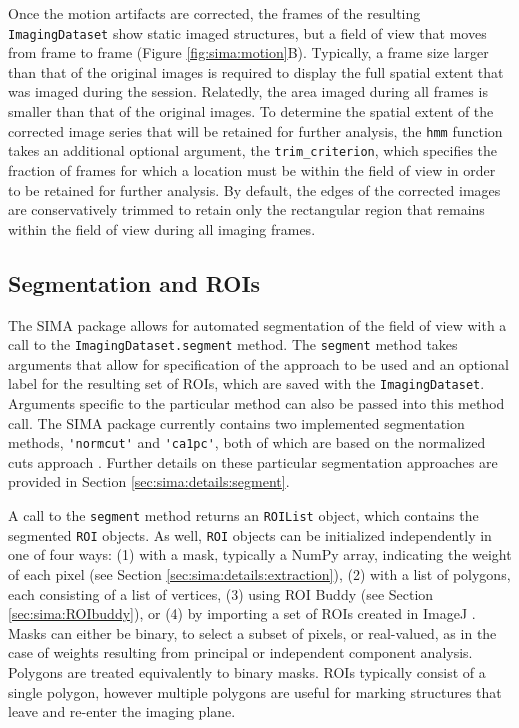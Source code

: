 Once the motion artifacts are corrected, the frames of the resulting \verb|ImagingDataset| show static
imaged structures, but a field of view that moves from frame to frame (Figure \ref{fig:sima:motion}B).
Typically, a frame size larger than that of the original images is required to display
the full spatial extent that was imaged during the session.
Relatedly, the area imaged during all frames is smaller than that of the original
images.
To determine the spatial extent of the corrected image series that will be
retained for further analysis, the \verb|hmm| function takes an additional
optional argument, 
the \verb|trim_criterion|, which specifies the fraction of frames for which
a location must be within the field of view in order to be retained for further
analysis.
By default, the edges of the corrected images are conservatively trimmed to retain
only the rectangular region that remains within the field of view during all imaging frames.


\subsection{Segmentation and ROIs}\label{sec:sima:ROIs}
The SIMA package allows for automated segmentation of the field of view with a call to the \verb|ImagingDataset.segment|
method.
The \verb|segment| method takes arguments that allow for specification of the approach
to be used and an optional label for the resulting set of ROIs, which are saved
with the \verb|ImagingDataset|.
Arguments specific to the particular method can also be passed into this
method call.
The SIMA package currently contains two implemented segmentation methods,
\verb|'normcut'| and \verb|'ca1pc'|, 
both of which are based on the normalized cuts approach \citep{Shi2000}.
Further details on these particular segmentation approaches are provided in Section \ref{sec:sima:details:segment}.

A call to the \verb|segment| method returns an \verb|ROIList| object,
which contains the segmented \verb|ROI| objects.
As well, \verb|ROI| objects can be initialized independently in one of four ways: 
(1) with a mask, typically a NumPy array, indicating the weight of each pixel (see Section \ref{sec:sima:details:extraction}),
(2) with a list of polygons, each consisting of a list of vertices,
(3) using ROI Buddy (see Section \ref{sec:sima:ROIbuddy}), or
(4) by importing a set of ROIs created in ImageJ \citep{schneider2012nih}.
Masks can either be binary, to select a subset of pixels, or real-valued, as in the case of
weights resulting from principal or independent component analysis.
Polygons are treated equivalently to binary masks.
ROIs typically consist of a single polygon, however multiple polygons are useful
for marking structures that leave and re-enter the imaging plane.

